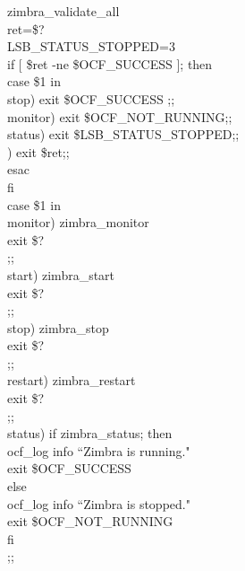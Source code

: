 \documentclass[a4paper, 12pt]{book}
\begin{document}
\noindent zimbra\_validate\_all\\
ret=\$?\\

\noindent LSB\_STATUS\_STOPPED=3\\
if [ \$ret -ne \$OCF\_SUCCESS ]; then\\
    \indent case \$1 in\\
    \indent \indent stop)       exit \$OCF\_SUCCESS ;;\\
    \indent \indent monitor)    exit \$OCF\_NOT\_RUNNING;;\\
    \indent \indent status)     exit \$LSB\_STATUS\_STOPPED;;\\
    \indent \indent *)          exit \$ret;;\\
    \indent esac\\
fi\\

\noindent case \$1 in\\
    \indent monitor)    zimbra\_monitor\\
                \indent \indent exit \$?\\
                \indent \indent ;;\\
    \indent start)      zimbra\_start\\
                \indent \indent exit \$?\\
                \indent \indent ;;\\

    \indent stop)       zimbra\_stop\\
                \indent \indent exit \$?\\
                \indent \indent ;;\\

    \indent restart)     zimbra\_restart\\
                \indent \indent exit \$?\\
                \indent \indent ;;\\

    \indent status)     if zimbra\_status; then\\
                    \indent \indent \indent \indent ocf\_log info ``Zimbra is running."\\
                    \indent \indent \indent \indent exit \$OCF\_SUCCESS\\
                \indent \indent \indent else\\
                    \indent \indent \indent \indent ocf\_log info ``Zimbra is stopped."\\
                    \indent \indent \indent \indent exit \$OCF\_NOT\_RUNNING\\
                \indent \indent \indent fi\\
                \indent \indent \indent ;;\\
\end{document}
